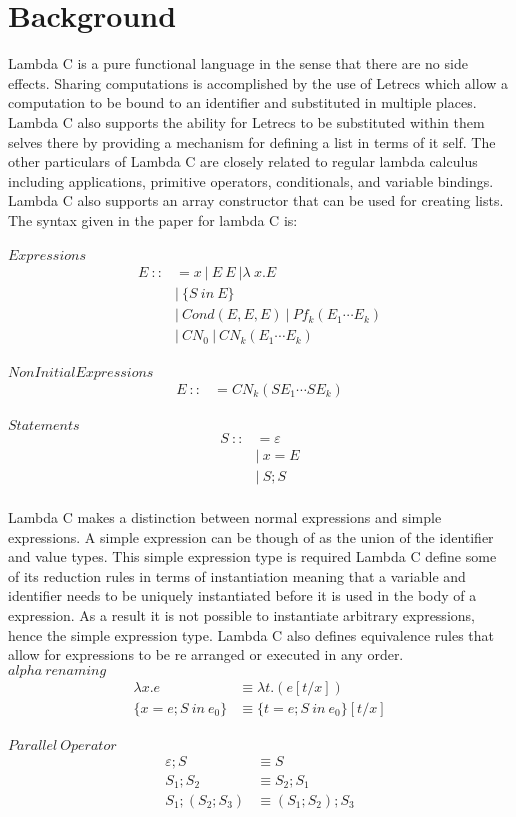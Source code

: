 \documentclass[preprint]{sigplanconf}
\begin{document}
\section{Background}
Lambda C is a pure functional language in the sense that there are no side effects. Sharing computations is accomplished by the use of Letrecs which allow a computation to be bound to an identifier and substituted in multiple places. Lambda C also supports the ability for Letrecs to be substituted within them selves there by providing a mechanism for defining a list in terms of it self. The other particulars of Lambda C are closely related to regular lambda calculus including applications, primitive operators, conditionals, and variable bindings. Lambda C also supports an array constructor that can be used for creating lists. The syntax given in the paper for lambda C is: 
\\
\\
$Expressions$ \cite{lambdas}
\begin{align}
E\ ::&= x\ |\ E\ E\ | \lambda\ x.E \\
&|\ \lbrace S\ in\ E \rbrace \\
&|\ Cond(E,E,E)\ |\ Pf_{k}(E_{1}\cdots E_{k}) \\
&|\ CN_{0}\ |\ CN_{k}(E_{1}\cdots E_{k}) 
\end{align}
\\
$Non Initial Expressions$
\begin{align}
E\ ::&= CN_{k}(SE_{1}\cdots SE_{k}) 
\end{align}
\\
$Statements$
\begin{align}
S\ ::&= \varepsilon\\
&|\ x = E\\
&|\ S;S 
\end{align}
\\
Lambda C makes a distinction between normal expressions and simple expressions. A simple expression can be though of as the union of the identifier and value types. This simple expression type is required Lambda C define some of its reduction rules in terms of instantiation meaning that a variable and identifier needs to be uniquely instantiated before it is used in the body of a expression. As a result it is not possible to instantiate arbitrary expressions, hence the simple expression type. Lambda C also defines equivalence rules that allow for expressions to be re arranged or executed in any order. 
\\
$alpha\ renaming$ 
\begin{align} 
\lambda x.e &\equiv \lambda t.(e[t/x]) \\
\lbrace x=e ; S\ in\ e_{0} \rbrace &\equiv \lbrace t = e; S\ in\ e_{0}  \rbrace [t/x]
\end{align}
\\
$Parallel\ Operator$
\begin{align}
\varepsilon ; S &\equiv S \\
S_{1} ; S_{2} &\equiv S_{2} ; S_{1}\\
S_{1} ; (S_{2} ; S_{3}) &\equiv (S_{1} ; S_{2}) ; S_{3}
\end{align}
\end{document}
